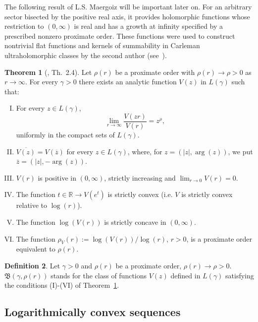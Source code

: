 \documentclass[11pt,a4paper]{article}
\theoremstyle{definition}
\newtheorem{theo}{Theorem}[section]
\newtheorem{defi}[theo]{Definition}
\def\oo{\infty}
\def\ri{\rightarrow}
\def\ga{\gamma}
\def\ro{\rho}
\def\Bet{\mathfrak{B}}
\def\R{\mathbb{R}}
\begin{document}
The following result of L.S. Maergoiz will be important later on. For an
arbitrary sector bisected by the positive real axis, it provides holomorphic functions whose
restriction to $(0,\oo)$ is real and has a growth at infinity specified by a prescribed nonzero proximate
order. These functions were used to construct nontrivial flat functions and kernels of summability in Carleman ultraholomorphic classes by the second author (see~\cite{SanzFlat}).


\begin{theo}[\cite{Maergoiz}, Th.\ 2.4]\label{theorpropanalproxorde}
Let $\ro(r)$ be a proximate order with $\ro(r)\to\ro>0$ as $r\to \infty$. For every $\ga>0$ there exists an analytic
function $V(z)$ in $L(\ga)$ such that:
  \begin{enumerate}[(I)]
  \item  For every $z \in L(\ga)$,
 \begin{equation*}
    \lim_{r \to \infty} \frac{V(zr)}{V(r)}= z^{\ro},
  \end{equation*}
uniformly in the compact sets of $L(\ga)$.
\item $\overline{V(z)}=V(\overline{z})$ for every $z \in L(\ga)$, where, for $z=(|z|,\arg(z))$, we
put $\overline{z}=(|z|,-\arg(z))$.
\item $V(r)$ is positive in $(0,\infty)$, strictly increasing and $\lim_{r\to 0}V(r)=0$.
\item The function $t\in\R\to V(e^t)$ is strictly convex (i.e. $V$ is strictly convex relative to $\log(r)$).
\item The function $\log(V(r))$ is strictly concave in $(0,\infty)$.
\item  The function $\ro_V(r):=\log( V(r))/\log(r)$, $r>0$, is a proximate order equivalent to $\ro(r)$.
    \end{enumerate}
\end{theo}


 \begin{defi}\label{defClassMaergoiz}
 Let $\ga>0$ and $\ro(r)$ be a proximate order, $\ro(r) \ri \ro >0$.  $\Bet(\ga,\ro(r))$ stands for the class of functions $V(z)$ defined in $L(\ga)$ satisfying the conditions (I)-(VI) of Theorem~\ref{theorpropanalproxorde}.

 \end{defi}


 \subsection{Logarithmically convex sequences}
\end{document}
